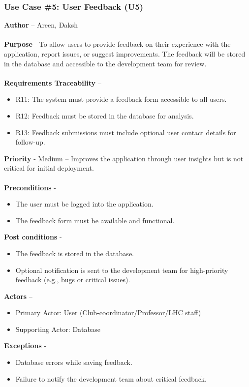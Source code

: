 \documentclass[a4paper,12pt]{article}
\begin{document}
 \subsubsection{Use Case \#5: User Feedback (U5)}
\textbf{Author} – Areen, Daksh \\\\
\textbf{Purpose} - To allow users to provide feedback on their experience with the application, report issues, or suggest improvements. The feedback will be stored in the database and accessible to the development team for review. \\\\
\textbf{Requirements Traceability} – 
\begin{itemize} 
    \item R11: The system must provide a feedback form accessible to all users.
    \item R12: Feedback must be stored in the database for analysis.
    \item R13: Feedback submissions must include optional user contact details for follow-up.
\end{itemize}
\textbf{Priority} - Medium – Improves the application through user insights but is not critical for initial deployment. \\\\
\textbf{Preconditions} - 
\begin{itemize} 
    \item The user must be logged into the application.
    \item The feedback form must be available and functional.
\end{itemize}
\textbf{Post conditions} - 
\begin{itemize} 
    \item The feedback is stored in the database.
    \item Optional notification is sent to the development team for high-priority feedback (e.g., bugs or critical issues).
\end{itemize}
\textbf{Actors} – 
\begin{itemize} 
    \item Primary Actor: User (Club-coordinator/Professor/LHC staff)
    \item Supporting Actor: Database
\end{itemize}
\textbf{Exceptions} - 
\begin{itemize} 
    \item Database errors while saving feedback.
    \item Failure to notify the development team about critical feedback.
\end{itemize}
\end{document}
